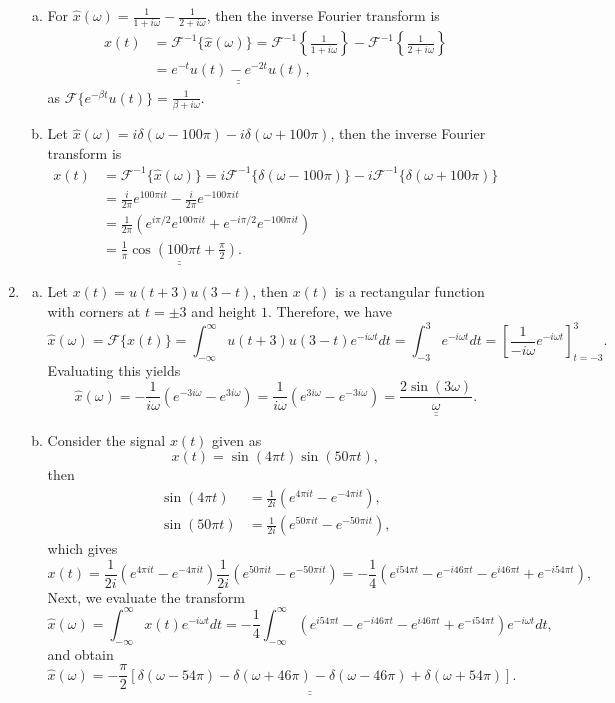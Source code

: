 \begin{enumerate}
\begin{enumerate}[a)]
\item For $\hat{x}(\omega)=\frac{1}{1+i\omega}-\frac{1}{2+i\omega}$, then the inverse Fourier transform is
\begin{align*}
    x(t)&=\mathcal{F}^{-1}\{\hat{x}(\omega)\}=\mathcal{F}^{-1}\left\{\frac{1}{1+i\omega}\right\}-\mathcal{F}^{-1}\left\{\frac{1}{2+i\omega}\right\} \\
    &=\underline{\underline{e^{-t}u(t)-e^{-2t}u(t)}},
\end{align*}
as $\mathcal{F}\{e^{-\beta t}u(t)\}=\frac{1}{\beta+i\omega}$. 

\item Let $\hat{x}(\omega)=i\delta(\omega-100\pi)-i\delta(\omega+100\pi)$, then the inverse Fourier transform is
\begin{align*}
    x(t)&=\mathcal{F}^{-1}\{\hat{x}(\omega)\}=i\mathcal{F}^{-1}\{\delta(\omega-100\pi)\}-i\mathcal{F}^{-1}\{\delta(\omega+100\pi)\} \\
    &=\frac{i}{2\pi}e^{100\pi it}-\frac{i}{2\pi}e^{-100\pi it} \\
    &=\frac{1}{2\pi}(e^{i\pi/2}e^{100\pi i t}+e^{-i\pi/2}e^{-100\pi i t}) \\
    &=\underline{\underline{\frac{1}{\pi}\cos\left(100\pi t+\frac{\pi}{2}\right)}}.
\end{align*}
\end{enumerate}

\item   
\begin{enumerate}[a)]
\item Let $x(t)=u(t+3)u(3-t)$, then $x(t)$ is a rectangular function with corners at $t=\pm 3$ and height $1$. Therefore, we have 
$$\hat{x}(\omega)=\mathcal{F}\{x(t)\}=\int_{-\infty}^{\infty}u(t+3)u(3-t)e^{-i\omega t}dt=\int_{-3}^{3}e^{-i\omega t}dt=\left[\frac{1}{-i\omega}e^{-i\omega t}\right]_{t=-3}^{3}.$$
Evaluating this yields
$$\hat{x}(\omega)=-\frac{1}{i\omega}(e^{-3i\omega}-e^{3i\omega})=\frac{1}{i\omega}(e^{3i\omega}-e^{-3i\omega})=\underline{\underline{\frac{2\sin(3\omega)}{\omega}}}.$$

\item Consider the signal $x(t)$ given as
$$x(t)=\sin(4\pi t)\sin(50\pi t),$$
then 
\begin{align*}
    \sin(4\pi t)&=\frac{1}{2i}(e^{4\pi i t}-e^{-4\pi it}), \\
    \sin(50\pi t)&=\frac{1}{2i}(e^{50\pi it}-e^{-50\pi it}),
\end{align*}
which gives
$$x(t)=\frac{1}{2i}\left(e^{4\pi it}-e^{-4\pi it}\right)\frac{1}{2i}\left(e^{50\pi it}-e^{-50\pi it}\right)=-\frac{1}{4}\left(e^{i54\pi t}-e^{-i46\pi t}-e^{i46\pi t}+e^{-i54\pi t}\right),$$
Next, we evaluate the transform
$$\hat{x}(\omega)=\int_{-\infty}^{\infty}x(t)e^{-i\omega t}dt=-\frac{1}{4}\int_{-\infty}^{\infty}\left(e^{i54\pi t}-e^{-i46\pi t}-e^{i46\pi t}+e^{-i54\pi t}\right)e^{-i\omega t}dt,$$
and obtain
$$\hat{x}(\omega)=\underline{\underline{-\frac{\pi}{2}[\delta(\omega-54\pi)-\delta(\omega+46\pi)-\delta(\omega-46\pi)+\delta(\omega+54\pi)]}}.$$


\end{enumerate}
\end{enumerate}
